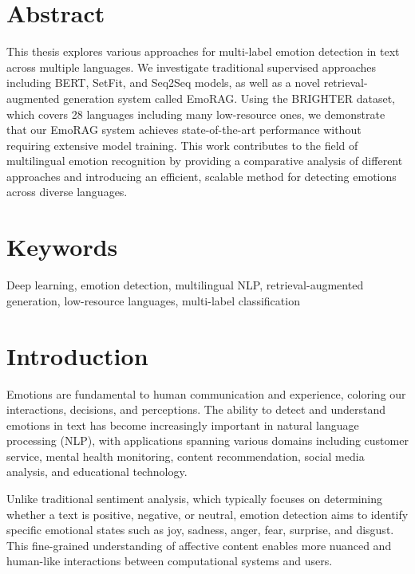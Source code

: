 \documentclass[a4paper,12pt]{extarticle}
\begin{document}
\newpage
\setcounter{page}{2}

{
	\hypersetup{linkcolor=black}
	\tableofcontents
}

\newpage

\section*{Abstract}

This thesis explores various approaches for multi-label emotion detection in text across multiple languages. We investigate traditional supervised approaches including BERT, SetFit, and Seq2Seq models, as well as a novel retrieval-augmented generation system called EmoRAG. Using the BRIGHTER dataset, which covers 28 languages including many low-resource ones, we demonstrate that our EmoRAG system achieves state-of-the-art performance without requiring extensive model training. This work contributes to the field of multilingual emotion recognition by providing a comparative analysis of different approaches and introducing an efficient, scalable method for detecting emotions across diverse languages.


\section*{Keywords}
Deep learning, emotion detection, multilingual NLP, retrieval-augmented generation, low-resource languages, multi-label classification

\section{Introduction}

Emotions are fundamental to human communication and experience, coloring our interactions, decisions, and perceptions. The ability to detect and understand emotions in text has become increasingly important in natural language processing (NLP), with applications spanning various domains including customer service, mental health monitoring, content recommendation, social media analysis, and educational technology.

Unlike traditional sentiment analysis, which typically focuses on determining whether a text is positive, negative, or neutral, emotion detection aims to identify specific emotional states such as joy, sadness, anger, fear, surprise, and disgust. This fine-grained understanding of affective content enables more nuanced and human-like interactions between computational systems and users.
\end{document}
